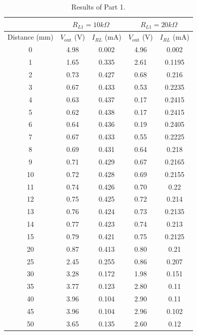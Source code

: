 \documentclass[CMPE]{KGCOEReport}
\begin{document}
\begin{table}[H]
    \centering
    \caption{Results of Part 1.}
    \begin{tabular}{|c|c|c|c|c|}
        \hline
        & \multicolumn{2}{|c|}{$R_{L1} = 10k\Omega$} & \multicolumn{2}{|c|}{$R_{L1} = 20k\Omega$} \\
        \hline
        Distance (mm) & $V_{\text{out}}$ (V) & $I_{RL}$ (mA) & $V_{\text{out}}$ (V) & $I_{RL}$ (mA) \\
        \hline
        0 & 4.98 & 0.002 & 4.96 & 0.002 \\
        \hline
        1 & 1.65 & 0.335 & 2.61 & 0.1195 \\
        \hline
        2 & 0.73 & 0.427 & 0.68 & 0.216 \\
        \hline
        3 & 0.67 & 0.433 & 0.53 & 0.2235 \\
        \hline
        4 & 0.63 & 0.437 & 0.17 & 0.2415 \\
        \hline
        5 & 0.62 & 0.438 & 0.17 & 0.2415 \\
        \hline
        6 & 0.64 & 0.436 & 0.19 & 0.2405 \\
        \hline
        7 & 0.67 & 0.433 & 0.55 & 0.2225 \\
        \hline
        8 & 0.69 & 0.431 & 0.64 & 0.218 \\
        \hline
        9 & 0.71 & 0.429 & 0.67 & 0.2165 \\
        \hline
        10 & 0.72 & 0.428 & 0.69 & 0.2155 \\
        \hline
        11 & 0.74 & 0.426 & 0.70 & 0.22 \\
        \hline
        12 & 0.75 & 0.425 & 0.72 & 0.214 \\
        \hline
        13 & 0.76 & 0.424 & 0.73 & 0.2135 \\
        \hline
        14 & 0.77 & 0.423 & 0.74 & 0.213 \\
        \hline
        15 & 0.79 & 0.421 & 0.75 & 0.2125 \\
        \hline
        20 & 0.87 & 0.413 & 0.80 & 0.21 \\
        \hline
        25 & 2.45 & 0.255 & 0.86 & 0.207 \\
        \hline
        30 & 3.28 & 0.172 & 1.98 & 0.151 \\
        \hline
        35 & 3.77 & 0.123 & 2.80 & 0.11 \\
        \hline
        40 & 3.96 & 0.104 & 2.90 & 0.11 \\
        \hline
        45 & 3.96 & 0.104 & 2.96 & 0.102 \\
        \hline
        50 & 3.65 & 0.135 & 2.60 & 0.12 \\
        \hline
    \end{tabular}
    \label{table:data}
\end{table}
\end{document}
